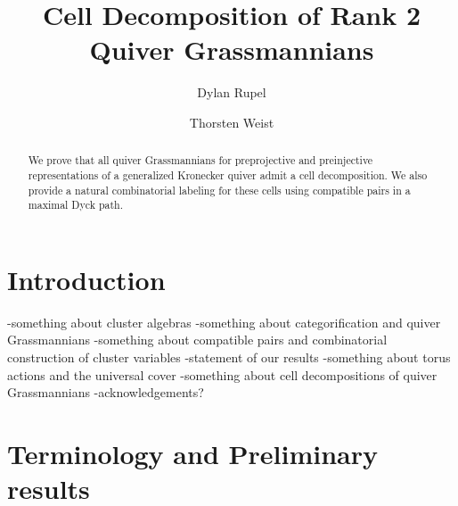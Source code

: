 \documentclass{amsart}
\title{Cell Decomposition of Rank 2 Quiver Grassmannians}
\author{Dylan Rupel}
\author{Thorsten Weist}
\begin{document}
\begin{abstract}
  We prove that all quiver Grassmannians for preprojective and preinjective representations of a generalized Kronecker quiver admit a cell decomposition.  
  We also provide a natural combinatorial labeling for these cells using compatible pairs in a maximal Dyck path. 
\end{abstract}
\maketitle

\section{Introduction}
-something about cluster algebras
-something about categorification and quiver Grassmannians
-something about compatible pairs and combinatorial construction of cluster variables
-statement of our results
-something about torus actions and the universal cover
-something about cell decompositions of quiver Grassmannians
-acknowledgements?


\section{Terminology and Preliminary results}
\end{document}
